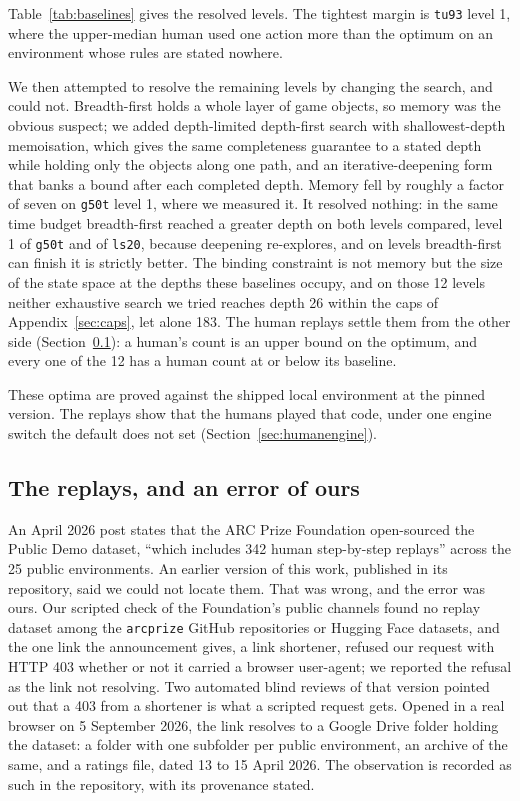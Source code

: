 \documentclass[11pt]{article}
\newcommand{\code}[1]{\texttt{#1}}
\begin{document}
Table~\ref{tab:baselines} gives the resolved levels. The tightest margin is
\code{tu93} level 1, where the upper-median human used one action
more than the optimum on an environment whose rules are stated nowhere.

We then attempted to resolve the remaining levels by changing the search, and
could not. Breadth-first holds a whole layer of game objects, so memory was the
obvious suspect; we added depth-limited depth-first search with shallowest-depth
memoisation, which gives the same completeness guarantee to a stated depth while
holding only the objects along one path, and an iterative-deepening form that
banks a bound after each completed depth. Memory fell by roughly a factor of
seven on \code{g50t} level 1, where we measured it. It resolved nothing: in the same time budget
breadth-first reached a greater depth on both levels compared, level 1 of
\code{g50t} and of \code{ls20}, because deepening
re-explores, and on levels breadth-first can finish it is strictly better. The
binding constraint is not memory but the size of the state space at the depths
these baselines occupy, and on those 12 levels neither exhaustive search we
tried reaches depth 26 within the caps of Appendix~\ref{sec:caps}, let alone
183. The human replays settle them from the
other side (Section~\ref{sec:replays}): a human's count is an upper bound on the
optimum, and every one of the 12 has a human count at or below its
baseline.

These optima are proved against the shipped local environment at the pinned
version. The replays show that the humans played that code, under one engine
switch the default does not set (Section~\ref{sec:humanengine}).

\subsection{The replays, and an error of ours}
\label{sec:replays}

An April 2026 post \cite{humandataset} states that the ARC Prize Foundation open-sourced
the Public Demo dataset, ``which includes 342 human step-by-step replays'' across
the 25 public environments. An earlier version of this work, published in its
repository, said we could not locate them. That was wrong, and the error was ours. Our scripted check of the
Foundation's public channels found no replay dataset among the \code{arcprize}
GitHub repositories or Hugging Face datasets, and the one link the announcement
gives, a link shortener, refused our request with HTTP 403 whether or not it
carried a browser user-agent; we reported the refusal as the link not resolving.
Two automated blind reviews of that version pointed out that a 403 from a
shortener is what a scripted request gets. Opened in a real browser on 5 September 2026, the link
resolves to a Google Drive folder holding the dataset: a folder with one
subfolder per public environment, an archive of the same, and a ratings file,
dated 13 to 15 April 2026. The observation is recorded as such in the
repository, with its provenance stated.
\end{document}

